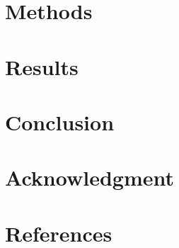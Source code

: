 \documentclass[journal,twoside,web]{ieeecolor}
\begin{document}
\section{Methods}
\label{sec:methods}

\section{Results}
\label{sec:results}

\section{Conclusion}
\label{sec:conclusion}

\section*{Acknowledgment}

\section*{References}
\end{document}
